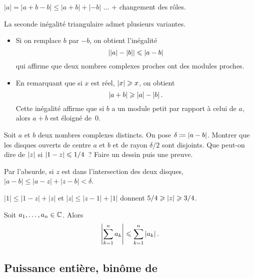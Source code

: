 \documentclass{magnoliaold}
\begin{document}
\begin{preuve}
$|a|=|a+b-b|\leq |a+b|+|-b|$ ... + changement des rôles.

\end{preuve}

\begin{remarqueUnique}
\remarque La seconde inégalité triangulaire admet plusieurs variantes.
  \begin{itemize}
  \item Si on remplace $b$ par $-b$, on obtient l'inégalité
    \[\left|\left|a\right|-\left|b\right|\right|\leqslant\left|a-b\right|\]
    qui affirme que deux nombres complexes proches ont des modules proches.
  \item En remarquant que si $x$ est réel, $\left|x\right|\geqslant x$, on obtient
    \[\left|a+b\right|\geqslant\left|a\right|-\left|b\right|.\]
    Cette inégalité affirme que si $b$ a un module petit par rapport à celui de $a$, alors $a+b$ est éloigné de~0.
  \end{itemize}
\end{remarqueUnique}

\begin{exos}
\exo Soit $a$ et $b$ deux nombres complexes distincts. On pose $\delta\coloneqq\left|a-b\right|$. Montrer que les disques ouverts de centre $a$ et $b$ et de rayon $\delta/2$ sont disjoints.
\exo Que peut-on dire de $\left|z\right|$ si $\left|1-z\right|\leqslant 1/4$~? Faire un dessin puis une preuve.
\begin{sol}
Par l'absurde, si $z$ est dans l'intersection des deux disques, $|a-b|\leq|a-z|+|z-b|<\delta$.

$|1|\leq |1-z|+|z|$ et $|z|\leq |z-1|+|1|$ donnent $5/4\geqslant \left|z\right|\geqslant 3/4$.
\end{sol}
\end{exos}

\begin{proposition}
Soit $a_1,\ldots,a_n\in\mathbb{C}$. Alors
\[\left|\sum_{k=1}^n a_k\right|\leqslant \sum_{k=1}^n \left|a_k\right|.\]
\end{proposition}


\subsection{Puissance entière, binôme de }
\end{document}
